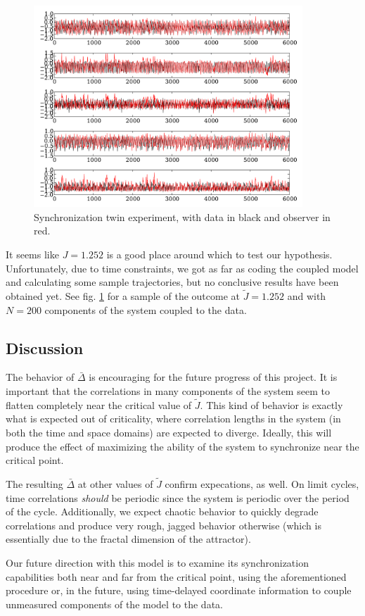 \documentclass{article} %
\begin{document}
\begin{figure}[p]
	\centering
	\includegraphics[width=0.9\textwidth]{paul_figs/sync_J_1_252_g_0_3}
	\caption{Synchronization twin experiment, with data in black and observer in red.}
	\label{fig:twinex}
\end{figure}

It seems like $J=1.252$ is a good place around which to test our hypothesis.  Unfortunately, due to time constraints, we got as far as coding the coupled model and calculating some sample trajectories, but no conclusive results have been obtained yet. See fig. \ref{fig:twinex} for a sample of the outcome at $\tilde{J}=1.252$ and with $N=200$ components of the system coupled to the data.

\subsection{Discussion}
The behavior of $\bar{\Delta}$ is encouraging for the future progress of this project.  It is important that the correlations in many components of the system seem to flatten completely near the critical value of $\tilde{J}$.  This kind of behavior is exactly what is expected out of criticality, where correlation lengths in the system (in both the time and space domains) are expected to diverge.  Ideally, this will produce the effect of maximizing the ability of the system to synchronize near the critical point.

The resulting $\bar{\Delta}$ at other values of $\tilde{J}$ confirm expecations, as well.  On limit cycles, time correlations \emph{should} be periodic since the system is periodic over the period of the cycle.  Additionally, we expect chaotic behavior to quickly degrade correlations and produce very rough, jagged behavior otherwise (which is essentially due to the fractal dimension of the attractor).

Our future direction with this model is to examine its synchronization capabilities both near and far from the critical point, using the aforementioned procedure or, in the future, using time-delayed coordinate information to couple unmeasured components of the model to the data.



\end{document}

